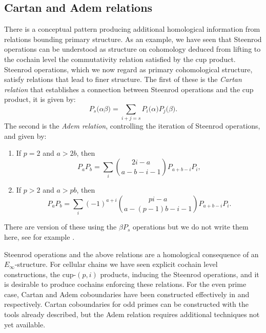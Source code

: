 \subsection{Cartan and Adem relations}

There is a conceptual pattern producing additional homological information from relations bounding primary structure.
As an example, we have seen that Steenrod operations can be understood as structure on cohomology deduced from lifting to the cochain level the commutativity relation satisfied by the cup product.
Steenrod operations, which we now regard as primary cohomological structure, satisfy relations that lead to finer structure.
The first of these is the \textit{Cartan relation} that establishes a connection between Steenrod operations and the cup product, it is given by:
\begin{equation*}
P_s\big(\alpha \beta \big) = \sum_{i+j=s} P_i\big( \alpha \big) P_j\big( \beta \big).
\end{equation*}
The second is the \textit{Adem relation}, controlling the iteration of Steenrod operations, and given by:
\begin{enumerate}
	\item If $p = 2$ and $a > 2b$, then
	\begin{equation*}
	P_{a} P_{b} = \sum_i \binom{2i-a}{a-b-i-1} P_{a+b-i}P_i,
	\end{equation*}
	\item If $p > 2$ and $a > pb$, then
	\begin{equation*}
	P_{a} P_{b} = \sum_i (-1)^{a+i} \binom{pi-a}{a-(p-1)b-i-1} P_{a+b-i}P_i.
	\end{equation*}
\end{enumerate}
There are version of these using the $\beta P_s$ operations but we do not write them here, see for example \cite{steenrod1962cohomology, may1970general}.

Steenrod operations and the above relations are a homological consequence of an $E_\infty$-structure.
For cellular chains we have seen explicit cochain level constructions, the cup-$(p,i)$ products, inducing the Steenrod operations, and it is desirable to produce cochains enforcing these relations.
For the even prime case, Cartan and Adem coboundaries have been constructed effectively in \cite{medina2020cartan} and \cite{medina2021adem} respectively.
Cartan coboundaries for odd primes can be constructed with the tools already described, but the Adem relation requires additional techniques not yet available.

